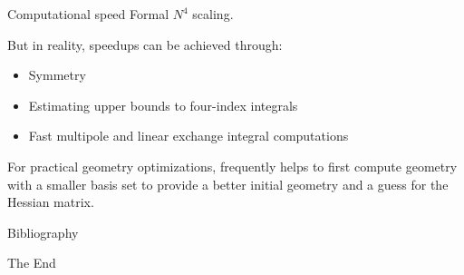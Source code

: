 \documentclass[aspectratio=169]{beamer}
\begin{document}
\begin{frame}{Computational speed}
Formal $N^4$ scaling.

But in reality, speedups can be achieved through:
\begin{itemize}
    \item Symmetry
    \item Estimating upper bounds to four-index integrals
    \item Fast multipole and linear exchange integral computations
\end{itemize}

For practical geometry optimizations, frequently helps to first compute geometry with a smaller basis set to provide a better initial geometry and a guess for the Hessian matrix.
    
\end{frame}


\begin{frame}[allowframebreaks]{Bibliography}
    
    
\end{frame}



\begin{frame}
    \Huge{\centerline{The End}}
\end{frame}
\end{document}
